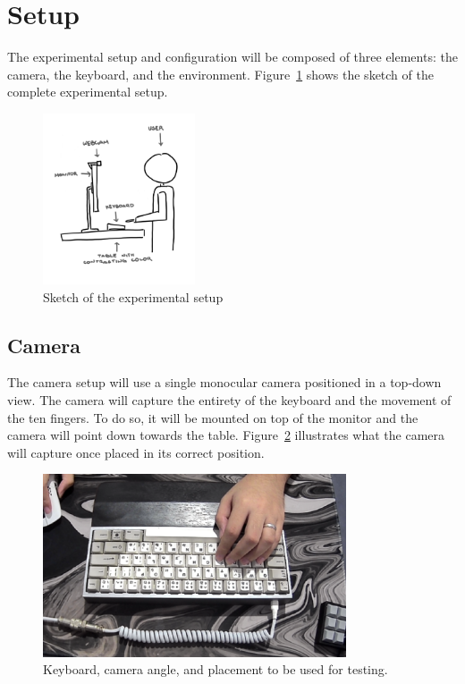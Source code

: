 \documentclass{report}
\begin{document}
\section{Setup}
\label{section:metho-setup}

The experimental setup and configuration will be composed of three elements: the
camera, the keyboard, and the environment. Figure~\ref{fig:metho-setup}
shows the sketch of the complete experimental setup.

\begin{figure}[H]
	\centering
	\includegraphics[width=0.4\textwidth]{setup.png}
	\caption{Sketch of the experimental setup}
	\label{fig:metho-setup}
	\centering
\end{figure}

\subsection{Camera}
The camera setup will use a single monocular camera positioned in a top-down
view. The camera will capture the entirety of the keyboard and the movement of
the ten fingers. To do so, it will be mounted on top of the monitor and the
camera will point down towards the table. Figure~\ref{fig:metho-setup-keeb}
illustrates what the camera will capture once placed in its correct position.

\begin{figure}[H]
	\centering
	\includegraphics[width=0.8\textwidth]{actual-keeb.png}
	\caption{Keyboard, camera angle, and placement to be used for testing.}
	\label{fig:metho-setup-keeb}
\end{figure}
\end{document}
